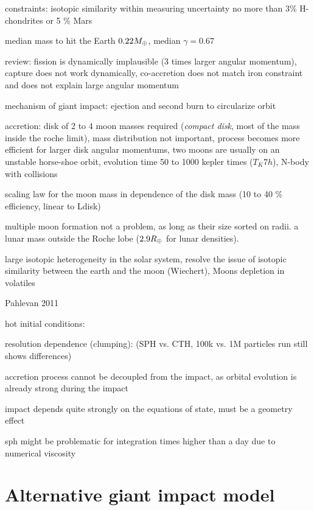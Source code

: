 constraints:
\cite{Wiechert:2001p3543}
isotopic similarity within measuring uncertainty
no more than 3\% H-chondrites or 5 \% Mars

\cite{Chambers:2001p2105}
median mass to hit the Earth $0.22 M_{\oplus}$, median $\gamma = 0.67$

\cite{Stevenson:1987p3540}
review: fission is dynamically implausible (3 times larger angular momentum), capture does not work dynamically, co-accretion does not match iron constraint and does not explain large angular momentum

mechanism of giant impact: ejection and second burn to circularize orbit

accretion:
\citep{Kokubo:2000p2195}
disk of 2 to 4 moon masses required (\emph{compact disk}, most of the mass inside the roche limit), mass distribution not important, process becomes more efficient for larger disk angular momentums, two moons are usually on an unstable horse-shoe orbit, evolution time 50 to 1000 kepler times ($T_K 7h$), N-body with collisions

\citep{Ida:1997p3395} scaling law for the moon mass in dependence of the disk mass (10 to 40 \% efficiency, linear to Ldisk)

\cite{Canup:1996p3541} multiple moon formation not a problem, as long as their size sorted on radii. a lunar mass outside the Roche lobe ($2.9 R_{\oplus}$ for lunar densities).

\citep{Pahlevan:2007p2065}
large isotopic heterogeneity in the solar system, resolve the issue of isotopic similarity between the earth and the moon (Wiechert), Moons depletion in volatiles


\cite{2011E&PSL.301..433P} Pahlevan 2011

hot initial conditions:
\citep{2000orem.book..179P}

resolution dependence (clumping):
\citep{Canup:2010p3713} (SPH vs. CTH, 100k vs. 1M particles run still shows differences)



accretion process cannot be decoupled from the impact, as orbital evolution is already strong during the impact

impact depends quite strongly on the equations of state, must be a geometry effect

sph might be problematic for integration times higher than a day due to numerical viscosity


\section{Alternative giant impact model}

